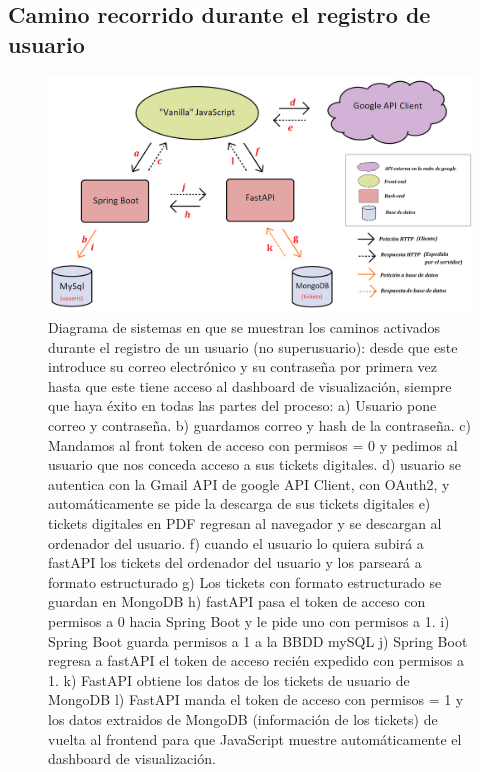 \documentclass[a4paper,12pt]{report}
\begin{document}
				
			\subsection{Camino recorrido durante el registro de usuario}
				
				
				\setlength{\belowcaptionskip}{3pt}
				\FloatBarrier
				\begin{figure}[H]
					\centering
					\includegraphics[width=1\textwidth]{img/diagramaSistemesAplicacioMercappCAMIREGISTREbo.png}
					\caption{Diagrama de sistemas en que se muestran los caminos activados durante el registro de un usuario (no superusuario): desde que este introduce su correo electrónico y su contraseña por primera vez hasta que este tiene acceso al dashboard de visualización, siempre que haya éxito en todas las partes del proceso: a) Usuario pone correo y contraseña. b) guardamos correo y hash de la contraseña. c) Mandamos al front token de acceso con permisos = 0 y pedimos al usuario que nos conceda acceso a sus tickets digitales. d) usuario se autentica con la Gmail API de google API Client, con OAuth2, y automáticamente se pide la descarga de sus tickets digitales e) tickets digitales en PDF regresan al navegador y se descargan al ordenador del usuario. f) cuando el usuario lo quiera subirá a fastAPI los tickets del ordenador del usuario y los parseará a formato estructurado g) Los tickets con formato estructurado se guardan en MongoDB h) fastAPI pasa el token de acceso con permisos a 0 hacia Spring Boot y le pide uno con permisos a 1. i) Spring Boot guarda permisos a 1 a la BBDD mySQL j) Spring Boot regresa a fastAPI el token de acceso recién expedido con permisos a 1. k) FastAPI obtiene los datos de los tickets de usuario de MongoDB l) FastAPI manda el token de acceso con permisos = 1 y los datos extraidos de MongoDB (información de los tickets) de vuelta al frontend para que JavaScript muestre automáticamente el dashboard de visualización.}
					\label{fig:diagramaSistemesAplicacioMercappCAMIREGISTRE} 
				\end{figure}
				\FloatBarrier
				
\end{document}
